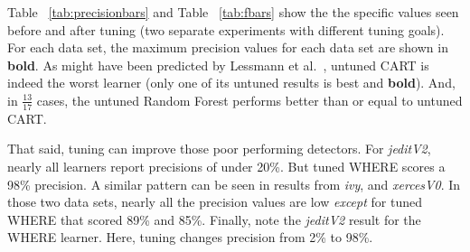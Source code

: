 \documentclass{sig-alternative}
\newcommand{\fig}[1]{Figure~\ref{fig:#1}}
\newcommand{\tab}[1]{Table ~\ref{tab:#1}}
\begin{document}
 
\tab{precisionbars} and \tab{fbars} show the
the specific values seen before and after tuning (two separate experiments with different tuning goals). 
For each data set, the maximum precision values for each data set are shown in {\bf bold}.
As might have been
 predicted by Lessmann et al.~\cite{lessmann2008benchmarking}, 
untuned CART is indeed the worst learner (only one of its
untuned results is best and {\bf bold}). 
And, 
in $\frac{13}{17}$ cases, the   untuned Random Forest performs better than or equal to untuned CART.  




That said,  tuning can improve those poor performing detectors.
For {\em jeditV2}, nearly all learners report precisions of under 20\%. But tuned  WHERE scores a 98\% precision.  
A similar pattern can be seen in results from {\em ivy},   and {\em xercesV0}.
In those two data sets, nearly all the precision values are   low {\em except} for
tuned WHERE that scored 89\% and 85\%.
Finally, note the  {\em jeditV2} result for the WHERE learner.
Here, tuning changes precision from 2\% to 98\%.
\end{document}
